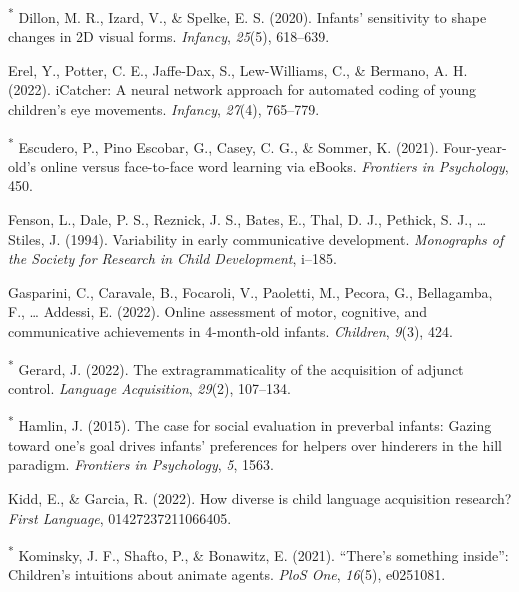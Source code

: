 \documentclass[
  man,floatsintext]{apa6}
\newlength{\cslhangindent}
\newlength{\cslentryspacingunit} %
\newenvironment{CSLReferences}[2] %
 {%
  \setlength{\parindent}{0pt}
  \ifodd #1
  \let\oldpar\par
  \def\par{\hangindent=\cslhangindent\oldpar}
  \fi
  \setlength{\parskip}{#2\cslentryspacingunit}
 }%
 {}
\begin{document}
\begin{CSLReferences}{1}{0}
\leavevmode{}%
\textsuperscript{*} Dillon, M. R., Izard, V., \& Spelke, E. S. (2020). Infants' sensitivity to shape changes in 2D visual forms. \emph{Infancy}, \emph{25}(5), 618--639.

\leavevmode{}%
Erel, Y., Potter, C. E., Jaffe-Dax, S., Lew-Williams, C., \& Bermano, A. H. (2022). iCatcher: A neural network approach for automated coding of young children's eye movements. \emph{Infancy}, \emph{27}(4), 765--779.

\leavevmode{}%
\textsuperscript{*} Escudero, P., Pino Escobar, G., Casey, C. G., \& Sommer, K. (2021). Four-year-old's online versus face-to-face word learning via eBooks. \emph{Frontiers in Psychology}, 450.

\leavevmode{}%
Fenson, L., Dale, P. S., Reznick, J. S., Bates, E., Thal, D. J., Pethick, S. J., \ldots{} Stiles, J. (1994). Variability in early communicative development. \emph{Monographs of the Society for Research in Child Development}, i--185.

\leavevmode{}%
Gasparini, C., Caravale, B., Focaroli, V., Paoletti, M., Pecora, G., Bellagamba, F., \ldots{} Addessi, E. (2022). Online assessment of motor, cognitive, and communicative achievements in 4-month-old infants. \emph{Children}, \emph{9}(3), 424.

\leavevmode{}%
\textsuperscript{*} Gerard, J. (2022). The extragrammaticality of the acquisition of adjunct control. \emph{Language Acquisition}, \emph{29}(2), 107--134.

\leavevmode{}%
\textsuperscript{*} Hamlin, J. (2015). The case for social evaluation in preverbal infants: Gazing toward one's goal drives infants' preferences for helpers over hinderers in the hill paradigm. \emph{Frontiers in Psychology}, \emph{5}, 1563.

\leavevmode{}%
Kidd, E., \& Garcia, R. (2022). How diverse is child language acquisition research? \emph{First Language}, 01427237211066405.

\leavevmode{}%
\textsuperscript{*} Kominsky, J. F., Shafto, P., \& Bonawitz, E. (2021). {``There's something inside''}: Children's intuitions about animate agents. \emph{PloS One}, \emph{16}(5), e0251081.


\end{CSLReferences}
\end{document}
